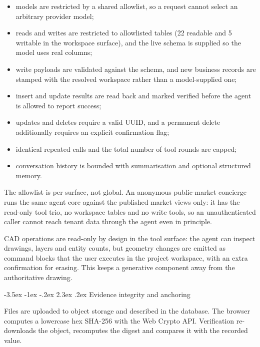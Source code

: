 \documentclass[10pt,a4paper,twocolumn]{article}
\makeatletter
\renewcommand\section{\@startsection{section}{1}{\z@}
  {-3.5ex \@plus -1ex \@minus -.2ex}
  {2.3ex \@plus.2ex}
  {\normalfont\Large\bfseries\hyphenpenalty=10000\exhyphenpenalty=10000}}
\makeatother
\begin{document}
\begin{itemize}
  \item models are restricted by a shared allowlist, so a request cannot select an
        arbitrary provider model;
  \item reads and writes are restricted to allowlisted tables (22 readable and
        5 writable in the workspace surface), and the live schema is
        supplied so the model uses real columns;
  \item write payloads are validated against the schema, and new business records are
        stamped with the resolved workspace rather than a model-supplied one;
  \item insert and update results are read back and marked verified before the agent
        is allowed to report success;
  \item updates and deletes require a valid UUID, and a permanent delete additionally
        requires an explicit confirmation flag;
  \item identical repeated calls and the total number of tool rounds are capped;
  \item conversation history is bounded with summarisation and optional structured
        memory.
\end{itemize}

The allowlist is per surface, not global. An anonymous public-market concierge runs
the same agent core against the published market views only: it has the read-only
tool trio, no workspace tables and no write tools, so an unauthenticated caller
cannot reach tenant data through the agent even in principle.

CAD operations are read-only by design in the tool surface: the agent can inspect
drawings, layers and entity counts, but geometry changes are emitted as command blocks
that the user executes in the project workspace, with an extra confirmation for
erasing. This keeps a generative component away from the authoritative drawing.

\section{Evidence integrity and anchoring}
\label{sec:evidence}

Files are uploaded to object storage and described in the database. The browser
computes a lowercase hex SHA-256 \cite{fips180} with the Web Crypto API. Verification
re-downloads the object, recomputes the digest and compares it with the recorded
value.
\end{document}
